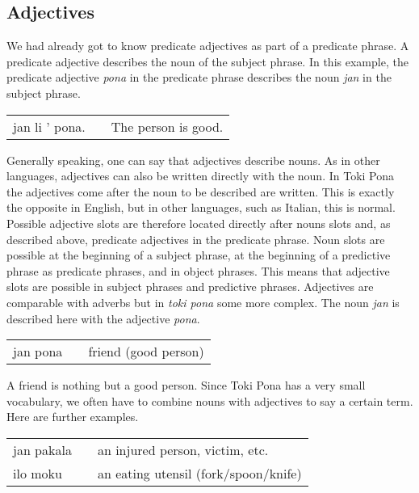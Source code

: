 \subsection*{Adjectives}
%

We had already got to know predicate adjectives as part of a predicate phrase.
A predicate adjective describes the noun of the subject phrase.
In this example, the predicate adjective \textit{pona} in the predicate phrase describes the noun \textit{jan} in the subject phrase.

\begin{supertabular}{p{5,5cm}|ll}
    jan li ' pona. &  & The person is good. \\
\end{supertabular}

Generally speaking, one can say that adjectives describe nouns.
As in other languages, adjectives can also be written directly with the noun.
In Toki Pona the adjectives come after the noun to be described are written.
This is exactly the opposite in English, but in other languages, such as Italian, this is normal.
Possible adjective slots are therefore located directly after nouns slots and, as described above, predicate adjectives in the predicate phrase.
Noun slots are possible at the beginning of a subject phrase, at the beginning of a predictive phrase as predicate phrases, and in object phrases.
This means that adjective slots are possible in subject phrases and predictive phrases.
Adjectives are comparable with adverbs but in \textit{toki pona} some more complex.
The noun \textit{jan} is described here with the adjective \textit{pona}.

\begin{supertabular}{p{5,5cm}|ll}
    jan pona &  & friend (good person) \\
\end{supertabular}

A friend is nothing but a good person.
Since Toki Pona has a very small vocabulary, we often have to combine nouns with adjectives to say a certain term.
Here are further examples.

\begin{supertabular}{p{5,5cm}|ll}
    jan pakala &  & an injured person, victim, etc.      \\
    ilo moku   &  & an eating utensil (fork/spoon/knife) \\
\end{supertabular}

